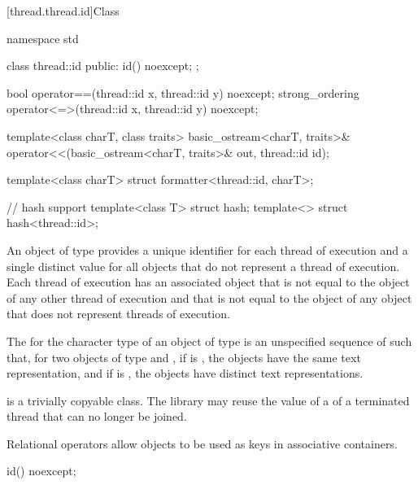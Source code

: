 [thread.thread.id]{Class }

%
%
\begin{codeblock}
namespace std {
  class thread::id {
  public:
    id() noexcept;
  };

  bool operator==(thread::id x, thread::id y) noexcept;
  strong_ordering operator<=>(thread::id x, thread::id y) noexcept;

  template<class charT, class traits>
    basic_ostream<charT, traits>&
      operator<<(basic_ostream<charT, traits>& out, thread::id id);

  template<class charT> struct formatter<thread::id, charT>;

  // hash support
  template<class T> struct hash;
  template<> struct hash<thread::id>;
}
\end{codeblock}

\pnum
An object of type  provides a unique identifier for
each thread of execution and a single distinct value for all 
objects that do not represent a thread of
execution. Each thread of execution has an
associated  object that is not equal to the
 object of any other thread of execution and that is not
equal to the  object of any  object that
does not represent threads of execution.

\pnum
The  for
the character type  of an object of type 
is an unspecified sequence of  such that,
for two objects of type   and ,
if  is ,
the  objects have the same text representation, and
if  is ,
the  objects have distinct text representations.

\pnum
{} is a trivially copyable class.
The library may reuse the value of a  of a terminated thread that can no longer be joined.

\pnum
\begin{note}
Relational operators allow  objects to be used as
keys in associative containers.
\end{note}

%
\begin{itemdecl}
id() noexcept;
\end{itemdecl}

